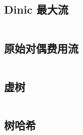 \documentclass[titlepage, a4paper]{article}
\begin{document}
\begin{multicols}{2}
\begin{spacing}{0.6}
				\subsection{Dinic 最大流}
					
					\inputminted[highlightlines={8,30}]{cpp}{src/TreeandGraph/Dinic.cpp}
				\subsection{原始对偶费用流}
					\inputminted[highlightlines={50}]{cpp}{src/TreeandGraph/原始对偶费用流.cpp}
				\subsection{虚树}
				\inputminted{cpp}{src/TreeandGraph/虚树.cpp}
				\subsection{树哈希}
				\inputminted{cpp}{src/TreeandGraph/TreeHash.cpp}
				

\end{spacing}
\end{multicols}
\end{document}
